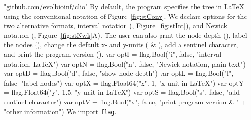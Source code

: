 \nwenddocs{}\endmoddef\nwstartdeflinemarkup{}\nwenddeflinemarkup
"github.com/evolbioinf/clio"
\nwendcode{}\nwdocspar
By default, the program specifies the tree in \LaTeX{} using the
conventional notation of Figure~\ref{fig:stConv}. We declare options
for the two alternative formats, interval notation (,
Figure~\ref{fig:stInt}), and Newick notation (,
Figure~\ref{fig:stNwk}A). The user can also print the node depth
(), label the nodes (), change the default x- and
y-units ( \& ), add a sentinel character, and print the
program version ().
\nwenddocs{}\endmoddef\nwstartdeflinemarkup{}\nwenddeflinemarkup
var optI = flag.Bool("i", false, "interval notation, LaTeX")
var optN = flag.Bool("n", false, "Newick notation, plain text")
var optD = flag.Bool("d", false, "show node depth")
var optL = flag.Bool("l", false, "label nodes")
var optX = flag.Float64("x", 1, "x-unit in LaTeX")
var optY = flag.Float64("y", 1.5, "y-unit in LaTeX")
var optS = flag.Bool("s", false, "add sentinel character")
var optV = flag.Bool("v", false, "print program version & " +
          "other information")
\nwendcode{}\nwdocspar
We import \texttt{flag}.
\nwenddocs{}\plusendmoddef\nwstartdeflinemarkup{}\nwenddeflinemarkup
